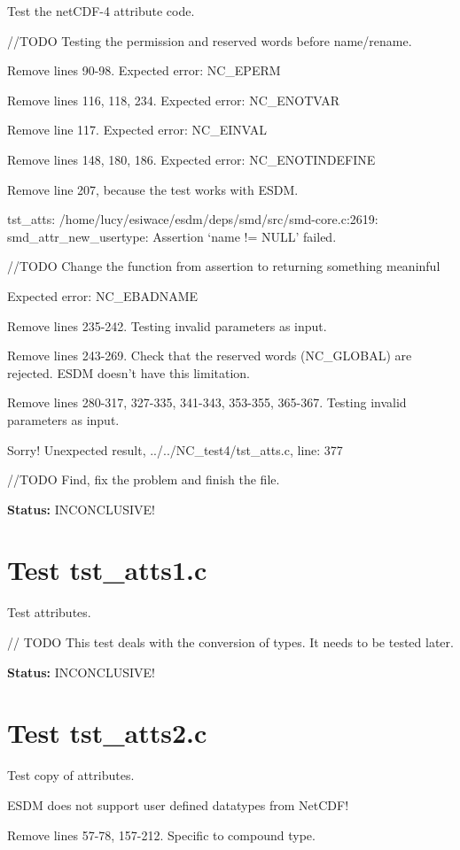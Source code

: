 Test the netCDF-4 attribute code.

//TODO Testing the permission and reserved words before name/rename.

Remove lines 90-98. Expected error: NC\_EPERM

Remove lines 116, 118, 234. Expected error: NC\_ENOTVAR

Remove line 117. Expected error: NC\_EINVAL

Remove lines 148, 180, 186. Expected error: NC\_ENOTINDEFINE

Remove line 207, because the test works with ESDM.

tst\_atts: /home/lucy/esiwace/esdm/deps/smd/src/smd-core.c:2619: smd\_attr\_new\_usertype: Assertion `name != NULL' failed.

//TODO Change the function from assertion to returning something meaninful

Expected error: NC\_EBADNAME

Remove lines 235-242. Testing invalid parameters as input.

Remove lines 243-269. Check that the reserved words (NC\_GLOBAL) are rejected. ESDM doesn't have this limitation.

Remove lines 280-317, 327-335, 341-343, 353-355, 365-367. Testing invalid parameters as input.

Sorry! Unexpected result, ../../NC\_test4/tst\_atts.c, line: 377

//TODO Find, fix the problem and finish the file.

{\bf \large Status: } INCONCLUSIVE!

\section{Test tst\_atts1.c}

Test attributes.

// TODO This test deals with the conversion of types. It needs to be tested later.

{\bf \large Status: } INCONCLUSIVE!

\section{Test tst\_atts2.c}

Test copy of attributes.

ESDM does not support user defined datatypes from NetCDF!

Remove lines 57-78, 157-212. Specific to compound type.

